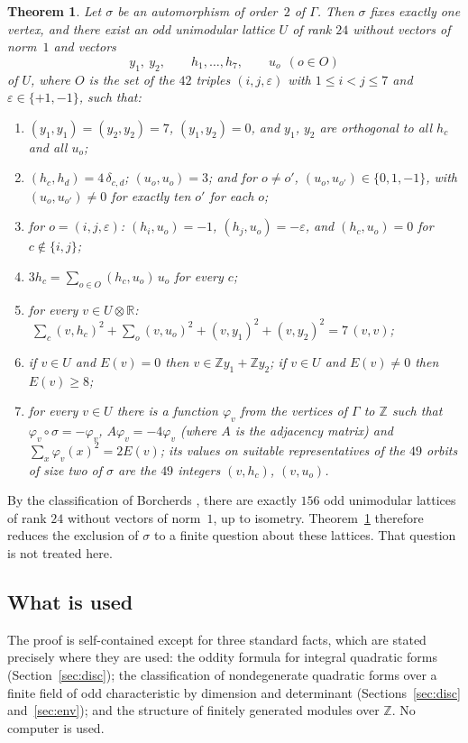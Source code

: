 \documentclass[11pt,a4paper]{article}
\newtheorem{theorem}{Theorem}[section]
\theoremstyle{definition}
\theoremstyle{remark}
\newcommand{\ZZ}{\mathbb{Z}}
\newcommand{\RR}{\mathbb{R}}
\newcommand{\sg}{\sigma}
\begin{document}
\begin{theorem}\label{thm:R}
Let $\sg$ be an automorphism of order~$2$ of $\Gamma$. Then $\sg$ fixes exactly one vertex, and there exist an odd
unimodular lattice $U$ of rank $24$ without vectors of norm~$1$ and vectors
\[
y_1,\ y_2,\qquad h_1,\dots,h_7,\qquad u_o\ \ (o\in O)
\]
of $U$, where $O$ is the set of the $42$ triples $(i,j,\varepsilon)$ with $1\le i<j\le7$ and
$\varepsilon\in\{+1,-1\}$, such that:
\begin{enumerate}[label=\textup{(R\arabic*)},leftmargin=3.2em]
\item\label{R1} $(y_1,y_1)=(y_2,y_2)=7$, $(y_1,y_2)=0$, and $y_1$, $y_2$ are orthogonal to all $h_c$ and all $u_o$;
\item\label{R2} $(h_c,h_d)=4\,\delta_{c,d}$; $(u_o,u_o)=3$; and for $o\ne o'$, $(u_o,u_{o'})\in\{0,1,-1\}$, with
$(u_o,u_{o'})\ne0$ for exactly ten $o'$ for each $o$;
\item\label{R3} for $o=(i,j,\varepsilon)$: $(h_i,u_o)=-1$, $(h_j,u_o)=-\varepsilon$, and $(h_c,u_o)=0$ for
$c\notin\{i,j\}$;
\item\label{R4} $3h_c=\sum_{o\in O}(h_c,u_o)\,u_o$ for every $c$;
\item\label{R5} for every $v\in U\otimes\RR$:
$\ \sum_c(v,h_c)^2+\sum_o(v,u_o)^2+(v,y_1)^2+(v,y_2)^2=7\,(v,v)$;
\item\label{R6} if $v\in U$ and $E(v)=0$ then $v\in\ZZ y_1+\ZZ y_2$; if $v\in U$ and $E(v)\ne0$ then $E(v)\ge 8$;
\item\label{R7} for every $v\in U$ there is a function $\varphi_v$ from the vertices of $\Gamma$ to $\ZZ$ such that
$\varphi_v\circ\sg=-\varphi_v$, $A\varphi_v=-4\varphi_v$ (where $A$ is the adjacency matrix) and
$\sum_x\varphi_v(x)^2=2E(v)$; its values on suitable representatives of the $49$ orbits of size two of $\sg$ are the
$49$ integers $(v,h_c)$, $(v,u_o)$.
\end{enumerate}
\end{theorem}

By the classification of Borcherds \cite{Bo}, there are exactly $156$ odd unimodular lattices of rank $24$ without vectors of
norm~$1$, up to isometry. Theorem~\ref{thm:R} therefore reduces the exclusion of $\sg$ to a finite question about
these lattices. That question is not treated here.

\subsection{What is used}
The proof is self-contained except for three standard facts, which are stated precisely where they are used:
the oddity formula for integral quadratic forms (Section~\ref{sec:disc}); the classification of nondegenerate
quadratic forms over a finite field of odd characteristic by dimension and determinant (Sections~\ref{sec:disc}
and~\ref{sec:env}); and the structure of finitely generated modules over $\ZZ$. No computer is used.
\end{document}
